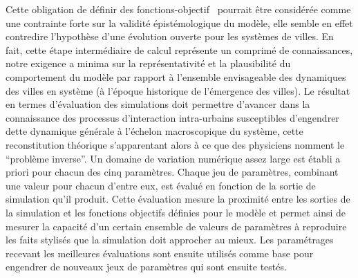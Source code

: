 \documentclass[10pt]{article}
\begin{document}
Cette obligation de définir des fonctions-objectif  pourrait être considérée comme une contrainte forte sur la validité épistémologique du modèle, elle semble en effet contredire l’hypothèse d’une évolution ouverte pour les systèmes de villes. En fait, cette étape intermédiaire de calcul représente un comprimé de connaissances, notre exigence a minima sur la représentativité et la plausibilité du comportement du modèle par rapport à l’ensemble envisageable des dynamiques des villes en système (à l’époque historique de l’émergence des villes). Le résultat en termes d’évaluation des simulations doit permettre d’avancer dans la connaissance des processus d’interaction intra-urbains susceptibles d’engendrer dette dynamique générale à l’échelon macroscopique du système, cette reconstitution théorique s’apparentant alors à ce que des physiciens nomment le “problème inverse”.
Un domaine de variation numérique assez large est établi a priori pour chacun des cinq paramètres. Chaque jeu de paramètres, combinant une valeur pour chacun d’entre eux, est évalué en fonction de la sortie de simulation qu'il produit. Cette évaluation mesure la proximité entre les sorties de la simulation et les fonctions objectifs définies pour le modèle et permet ainsi de mesurer la capacité d’un certain ensemble de valeurs de paramètres à reproduire les faits stylisés que la simulation doit approcher au mieux. Les paramétrages recevant les meilleures évaluations sont ensuite utilisés comme base pour engendrer de nouveaux jeux de paramètres qui sont ensuite testés. 
\end{document}
